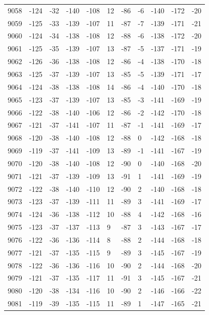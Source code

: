 \begin{table}[H]
\begin{tabular}{lllllllllll}
9058 & -124 & -32 & -140 & -108 & 12 & -86 & -6 & -140 & -172 & -20 \\
9059 & -125 & -33 & -139 & -107 & 11 & -87 & -7 & -139 & -171 & -21 \\
9060 & -124 & -34 & -138 & -108 & 12 & -88 & -6 & -138 & -172 & -20 \\
9061 & -125 & -35 & -139 & -107 & 13 & -87 & -5 & -137 & -171 & -19 \\
9062 & -126 & -36 & -138 & -108 & 12 & -86 & -4 & -138 & -170 & -18 \\
9063 & -125 & -37 & -139 & -107 & 13 & -85 & -5 & -139 & -171 & -17 \\
9064 & -124 & -38 & -138 & -108 & 14 & -86 & -4 & -140 & -170 & -18 \\
9065 & -123 & -37 & -139 & -107 & 13 & -85 & -3 & -141 & -169 & -19 \\
9066 & -122 & -38 & -140 & -106 & 12 & -86 & -2 & -142 & -170 & -18 \\
9067 & -121 & -37 & -141 & -107 & 11 & -87 & -1 & -141 & -169 & -17 \\
9068 & -120 & -38 & -140 & -108 & 12 & -88 & 0 & -142 & -168 & -18 \\
9069 & -119 & -37 & -141 & -109 & 13 & -89 & -1 & -141 & -167 & -19 \\
9070 & -120 & -38 & -140 & -108 & 12 & -90 & 0 & -140 & -168 & -20 \\
9071 & -121 & -37 & -139 & -109 & 13 & -91 & 1 & -141 & -169 & -19 \\
9072 & -122 & -38 & -140 & -110 & 12 & -90 & 2 & -140 & -168 & -18 \\
9073 & -123 & -37 & -139 & -111 & 11 & -89 & 3 & -141 & -169 & -17 \\
9074 & -124 & -36 & -138 & -112 & 10 & -88 & 4 & -142 & -168 & -16 \\
9075 & -123 & -37 & -137 & -113 & 9 & -87 & 3 & -143 & -167 & -17 \\
9076 & -122 & -36 & -136 & -114 & 8 & -88 & 2 & -144 & -168 & -18 \\
9077 & -121 & -37 & -135 & -115 & 9 & -89 & 3 & -145 & -167 & -19 \\
9078 & -122 & -36 & -136 & -116 & 10 & -90 & 2 & -144 & -168 & -20 \\
9079 & -121 & -37 & -135 & -117 & 11 & -91 & 3 & -145 & -167 & -21 \\
9080 & -120 & -38 & -134 & -116 & 10 & -90 & 2 & -146 & -166 & -22 \\
9081 & -119 & -39 & -135 & -115 & 11 & -89 & 1 & -147 & -165 & -21 \\

\end{tabular}
\end{table}
